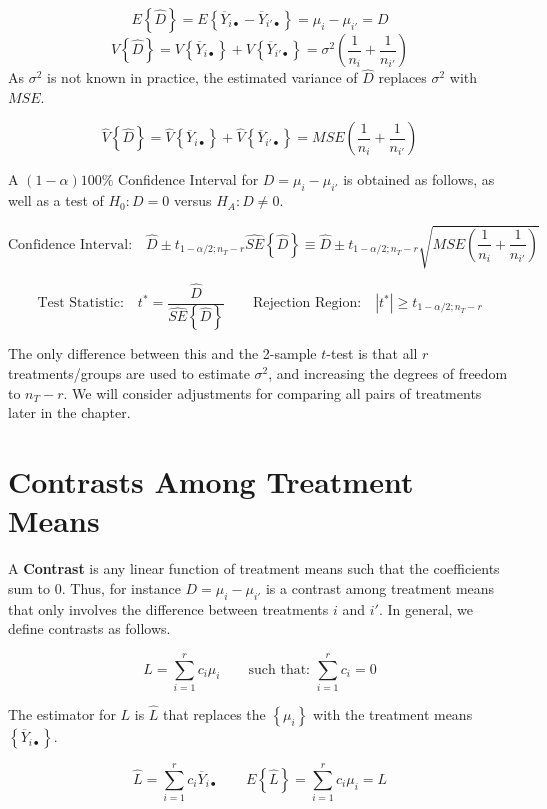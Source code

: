 \documentclass[
]{book}
\begin{document}
\[
E\left\{\hat{D}\right\}=E\left\{\overline{Y}_{i\bullet}-\overline{Y}_{i'\bullet}\right\}=\mu_i-\mu_{i'}=D 
\] \[
V\left\{\hat{D}\right\}=
V\left\{\overline{Y}_{i\bullet}\right\} +
V\left\{\overline{Y}_{i'\bullet}\right\}
=\sigma^2\left(\frac{1}{n_i}+\frac{1}{n_{i'}}\right)
\] As \(\sigma^2\) is not known in practice, the estimated variance of
\(\hat{D}\) replaces \(\sigma^2\) with \(MSE\).

\[
\hat{V}\left\{\hat{D}\right\}=
\hat{V}\left\{\overline{Y}_{i\bullet}\right\} +
\hat{V}\left\{\overline{Y}_{i'\bullet}\right\}
=MSE\left(\frac{1}{n_i}+\frac{1}{n_{i'}}\right)
\]

A \((1-\alpha)100\%\) Confidence Interval for \(D=\mu_i-\mu_{i'}\) is
obtained as follows, as well as a test of \(H_0:D=0\) versus
\(H_A:D\ne 0\).

\[
\mbox{Confidence Interval:} \quad
\hat{D} \pm t_{1-\alpha/2;n_T-r}\hat{SE}\left\{\hat{D}\right\}  \equiv
\hat{D} \pm t_{1-\alpha/2;n_T-r}
\sqrt{MSE\left(\frac{1}{n_i}+\frac{1}{n_{i'}}\right)}
\]

\[
\mbox{Test Statistic:} \quad t^*=\frac{\hat{D}}{\hat{SE}\left\{\hat{D}\right\}}
\qquad \mbox{Rejection Region:} \quad
\left|t^*\right| \ge t_{1-\alpha/2;n_T-r}
\]

The only difference between this and the 2-sample \(t\)-test is that all
\(r\) treatments/groups are used to estimate \(\sigma^2\), and
increasing the degrees of freedom to \(n_T-r\). We will consider
adjustments for comparing all pairs of treatments later in the chapter.

\section{Contrasts Among Treatment
Means}\label{contrasts-among-treatment-means}

A \textbf{Contrast} is any linear function of treatment means such that
the coefficients sum to 0. Thus, for instance \(D=\mu_i-\mu_{i'}\) is a
contrast among treatment means that only involves the difference between
treatments \(i\) and \(i'\). In general, we define contrasts as follows.

\[
L = \sum_{i=1}^rc_i\mu_i \qquad \mbox{such that: } \sum_{i=1}^rc_i=0
\]

The estimator for \(L\) is \(\hat{L}\) that replaces the
\(\left\{\mu_i\right\}\) with the treatment means
\(\left\{\overline{Y}_{i\bullet}\right\}\).

\[
\hat{L}=\sum_{i=1}^rc_i\overline{Y}_{i\bullet} \qquad
E\left\{\hat{L}\right\}=\sum_{i=1}^rc_i\mu_i=L
\]
\end{document}
